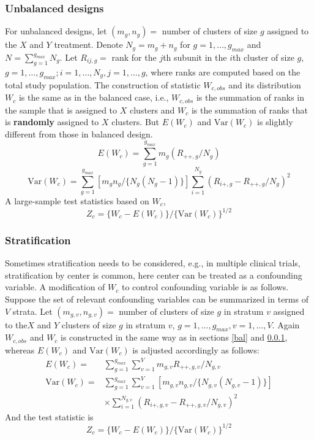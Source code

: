 \documentclass[article]{jss}
\begin{document}
\subsubsection{Unbalanced designs}\label{unbal}
For unbalanced designs, let $(m_g, n_g)=$ number of clusters of size $g$ assigned to the $X$ and $Y$ treatment. Denote $N_g = m_g + n_g$ for $g=1,\ldots,g_{max}$ and $N =\sum_{g=1}^{g_{max}}N_g$. Let $R_{ij,g} = $ rank for the $j$th subunit in the $i$th cluster of size $g$, $g = 1, \ldots,g_{max}; i = 1, \ldots,N_g,j=1,\ldots,g$, where ranks are computed based on the total study population. 
The construction of statistic $W_{c,obs}$ and its distribution $W_c$ is the same as in the balanced case, i.e., $W_{c,obs}$ is the summation of ranks in the sample that is assigned to $X$ clusters and $W_c$ is the summation of ranks that is \textbf{randomly} assigned to $X$ clusters. But $E(W_c)$ and $\text{Var}(W_c)$ is slightly different from those in balanced design. 
\begin{equation}\label{eq:uEWc}
E(W_c) = \sum_{g=1}^{g_{max}}m_g(R_{++,g}/N_g)
\end{equation}
\begin{equation}\label{eq:uVWc}
\text{Var}(W_c) = \sum_{g=1}^{g_{max}}[m_gn_g/\{N_g(N_g - 1)\}]\sum_{i=1}^{N_g}(R_{i+,g} - R_{++,g}/N_g)^2
\end{equation}
A large-sample test statistics based on $W_c$,%
\begin{equation}
Z_c = \{W_c - E(W_c)\}/\{\text{Var}(W_c)\}^{1/2}
\end{equation}
\subsubsection{Stratification}
Sometimes stratification needs to be considered, e.g., in multiple clinical trials, stratification by center is common, here center can be treated as a confounding variable. A modification of $W_c$ to control confounding variable is as follows. Suppose the set of relevant confounding variables can be summarized in terms of $V$ strata. Let $(m_{g,v}, n_{g,v})=$ number of clusters of size $g$ in stratum $v$ assigned to the$X$ and $Y$ clusters of size $g$ in stratum $v$, $g = 1, \ldots, g_{max}, v = 1, \ldots, V$. Again $W_{c,obs}$ and $W_c$ is constructed in the same way as in sections \ref{bal} and \ref{unbal}, whereas $E(W_c)$ and $\text{Var}(W_c)$ is adjusted accordingly as follows:
\begin{align*}
E(W_c)=& \sum_{g=1}^{g_{max}}\sum^V_{v=1}m_{g,v}R_{++,g,v}/N_{g,v}\\
\text{Var}(W_c)=& \sum_{g=1}^{g_{max}}\sum_{v=1}^V[m_{g,v}n_{g,v}/\{N_{g,v}(N_{g,v} - 1)\}]\\ 
&\times\sum_{i=1}^{N_{g,v}}(R_{i+, g, v} - R_{++, g, v}/N_{g,v})^2
\end{align*}
And the test statistic is
\begin{equation}
Z_c = \{W_c - E(W_c)\}/\{\text{Var}(W_c)\}^{1/2}
\end{equation}
\end{document}
